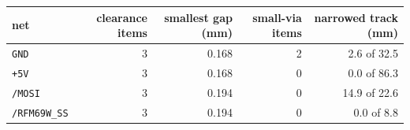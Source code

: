\begin{tabular}{lrrrr}
\toprule
net & clearance items & smallest gap (mm) & small-via items & narrowed track (mm) \\
\midrule
\texttt{GND} & 3 & 0.168 & 2 & 2.6 of 32.5 \\
\texttt{+5V} & 3 & 0.168 & 0 & 0.0 of 86.3 \\
\texttt{/MOSI} & 3 & 0.194 & 0 & 14.9 of 22.6 \\
\texttt{/RFM69W\_SS} & 3 & 0.194 & 0 & 0.0 of 8.8 \\
\bottomrule
\end{tabular}
